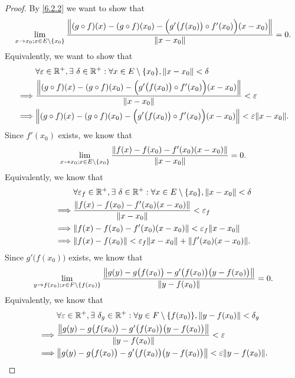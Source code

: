 \begin{proof}
  By \cref{6.2.2} we want to show that
  \[
    \lim_{x \to x_0 ; x \in E \setminus \{x_0\}} \frac{\norm*{(g \circ f)(x) - (g \circ f)(x_0) - \Big(g'\big(f(x_0)\big) \circ f'(x_0)\Big)(x - x_0)}}{\norm*{x - x_0}} = 0.
  \]
  Equivalently, we want to show that
  \begin{align*}
             & \forall \varepsilon \in \R^+, \exists\ \delta \in \R^+ : \forall x \in E \setminus \{x_0\}, \norm*{x - x_0} < \delta                  \\
    \implies & \frac{\norm*{(g \circ f)(x) - (g \circ f)(x_0) - \Big(g'\big(f(x_0)\big) \circ f'(x_0)\Big)(x - x_0)}}{\norm*{x - x_0}} < \varepsilon \\
    \implies & \norm*{(g \circ f)(x) - (g \circ f)(x_0) - \Big(g'\big(f(x_0)\big) \circ f'(x_0)\Big)(x - x_0)} < \varepsilon \norm*{x - x_0}.
  \end{align*}
  Since \(f'(x_0)\) exists, we know that
  \[
    \lim_{x \to x_0 ; x \in E \setminus \{x_0\}} \frac{\norm*{f(x) - f(x_0) - f'(x_0)(x - x_0)}}{\norm*{x - x_0}} = 0.
  \]
  Equivalently, we know that
  \begin{align*}
             & \forall \varepsilon_f \in \R^+, \exists\ \delta \in \R^+ : \forall x \in E \setminus \{x_0\}, \norm*{x - x_0} < \delta \\
    \implies & \frac{\norm*{f(x) - f(x_0) - f'(x_0)(x - x_0)}}{\norm*{x - x_0}} < \varepsilon_f                                       \\
    \implies & \norm*{f(x) - f(x_0) - f'(x_0)(x - x_0)} < \varepsilon_f \norm*{x - x_0}                                               \\
    \implies & \norm*{f(x) - f(x_0)} < \varepsilon_f \norm*{x - x_0} + \norm*{f'(x_0)(x - x_0)}.
  \end{align*}
  Since \(g'\big(f(x_0)\big)\) exists, we know that
  \[
    \lim_{y \to f(x_0) ; x \in F \setminus \{f(x_0)\}} \frac{\norm*{g(y) - g\big(f(x_0)\big) - g'\big(f(x_0)\big)\big(y - f(x_0)\big)}}{\norm*{y - f(x_0)}} = 0.
  \]
  Equivalently, we know that
  \begin{align*}
             & \forall \varepsilon \in \R^+, \exists\ \delta_g \in \R^+ : \forall y \in F \setminus \{f(x_0)\}, \norm*{y - f(x_0)} < \delta_g \\
    \implies & \frac{\norm*{g(y) - g\big(f(x_0)\big) - g'\big(f(x_0)\big)\big(y - f(x_0)\big)}}{\norm*{y - f(x_0)}} < \varepsilon             \\
    \implies & \norm*{g(y) - g\big(f(x_0)\big) - g'\big(f(x_0)\big)\big(y - f(x_0)\big)} < \varepsilon \norm*{y - f(x_0)}.

\end{align*}
\end{proof}
